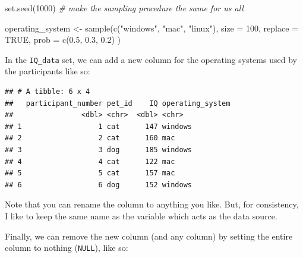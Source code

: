 \documentclass[
]{book}
\newenvironment{Shaded}{\begin{snugshade}}{\end{snugshade}}
\newcommand{\AttributeTok}[1]{\textcolor[rgb]{0.77,0.63,0.00}{#1}}
\newcommand{\CommentTok}[1]{\textcolor[rgb]{0.56,0.35,0.01}{\textit{#1}}}
\newcommand{\ConstantTok}[1]{\textcolor[rgb]{0.00,0.00,0.00}{#1}}
\newcommand{\DecValTok}[1]{\textcolor[rgb]{0.00,0.00,0.81}{#1}}
\newcommand{\FloatTok}[1]{\textcolor[rgb]{0.00,0.00,0.81}{#1}}
\newcommand{\FunctionTok}[1]{\textcolor[rgb]{0.00,0.00,0.00}{#1}}
\newcommand{\NormalTok}[1]{#1}
\newcommand{\OtherTok}[1]{\textcolor[rgb]{0.56,0.35,0.01}{#1}}
\newcommand{\SpecialCharTok}[1]{\textcolor[rgb]{0.00,0.00,0.00}{#1}}
\newcommand{\StringTok}[1]{\textcolor[rgb]{0.31,0.60,0.02}{#1}}
\begin{document}
\begin{Shaded}
\begin{Highlighting}[]
\FunctionTok{set.seed}\NormalTok{(}\DecValTok{1000}\NormalTok{) }\CommentTok{\# make the sampling procedure the same for us all}

\NormalTok{operating\_system }\OtherTok{\textless{}{-}} \FunctionTok{sample}\NormalTok{(}\FunctionTok{c}\NormalTok{(}\StringTok{"windows"}\NormalTok{, }\StringTok{"mac"}\NormalTok{, }\StringTok{"linux"}\NormalTok{), }
                           \AttributeTok{size =} \DecValTok{100}\NormalTok{, }
                           \AttributeTok{replace =} \ConstantTok{TRUE}\NormalTok{,}
                           \AttributeTok{prob =} \FunctionTok{c}\NormalTok{(}\FloatTok{0.5}\NormalTok{, }\FloatTok{0.3}\NormalTok{, }\FloatTok{0.2}\NormalTok{)}
\NormalTok{                           )}
\end{Highlighting}
\end{Shaded}

In the \texttt{IQ\_data} set, we can add a new column for the operating systems used by the participants like so:

\begin{Shaded}
\end{Shaded}

\begin{verbatim}
## # A tibble: 6 x 4
##   participant_number pet_id    IQ operating_system
##                <dbl> <chr>  <dbl> <chr>           
## 1                  1 cat      147 windows         
## 2                  2 cat      160 mac             
## 3                  3 dog      185 windows         
## 4                  4 cat      122 mac             
## 5                  5 cat      157 mac             
## 6                  6 dog      152 windows
\end{verbatim}

Note that you can rename the column to anything you like. But, for consistency, I like to keep the same name as the variable which acts as the data source.

Finally, we can remove the new column (and any column) by setting the entire column to nothing (\texttt{NULL}), like so:
\end{document}
